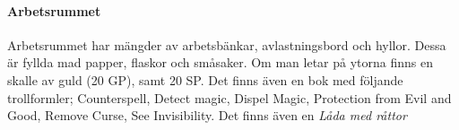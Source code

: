 \paragraph{Arbetsrummet}
Arbetsrummet har mängder av arbetsbänkar, avlastningsbord och hyllor. Dessa är fyllda mad papper, flaskor och småsaker. Om man letar på ytorna finns en skalle av guld (20 GP), samt 20 SP. Det finns även en bok med följande trollformler; Counterspell, Detect magic, Dispel Magic, Protection from Evil and Good, Remove Curse, See Invisibility. Det finns även en \textit{Låda med råttor} \sectiondescribe{\ref{ladaMedRattor}}